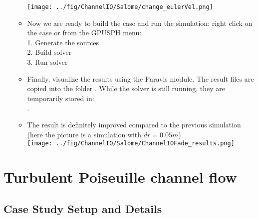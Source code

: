 \documentclass{../GPUSPHtemplate}
\begin{document}
\begin{enumerate}
\begin{itemize}
    \texttt{[image: ../fig/ChannelIO/Salome/change\_eulerVel.png]}\medskip
  \item Now we are ready to build the case and run the simulation: right click on the case or from the GPUSPH menu:\\
    1. Generate the sources\\
    2. Build solver\\
    3. Run solver
  \item Finally, visualize the results using the Paravis module. The result files are copied into the folder
    . While the solver is still running, they are temporarily stored in:\\
    .
  \item The result is definitely improved compared to the previous simulation (here the picture is a simulation with
    $dr = 0.05m$).\smallskip\\
    \texttt{[image: ../fig/ChannelIO/Salome/ChannelIOFade\_results.png]}\medskip\\
  \end{itemize}
\end{enumerate}

\section{Turbulent Poiseuille channel flow}


\subsection{Case Study Setup and Details}
   
\end{document}
